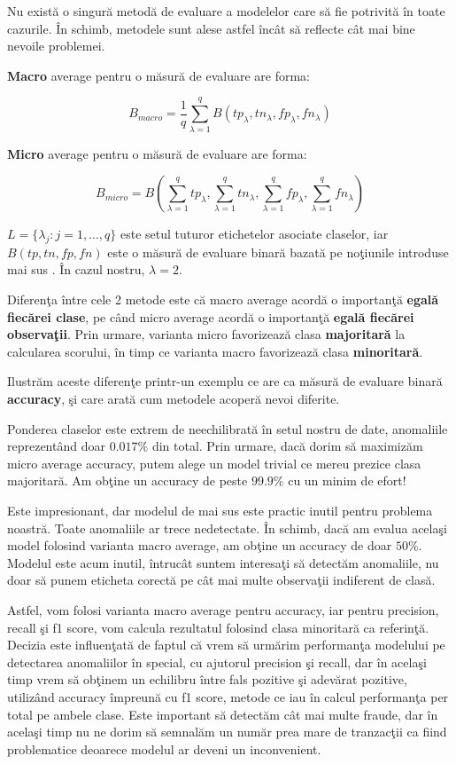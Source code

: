 Nu există o singură metodă de evaluare a modelelor care să fie potrivită în toate 
cazurile. În schimb, metodele sunt alese astfel încât să reflecte cât mai bine 
nevoile problemei.

\textbf{Macro} average pentru o măsură de evaluare are forma:

$$B_{macro}=\frac{1}{q} \sum_{\lambda=1}^{q} B(tp_{\lambda}, tn_{\lambda}, fp_{\lambda},
fn_{\lambda})$$

\textbf{Micro} average pentru o măsură de evaluare are forma:

$$B_{micro}=B(\sum_{\lambda=1}^{q} tp_{\lambda}, \sum_{\lambda=1}^{q} tn_{\lambda}, 
\sum_{\lambda=1}^{q} fp_{\lambda}, \sum_{\lambda=1}^{q} fn_{\lambda})$$

$L=\{\lambda_{j}: j=1,\dots,q \}$ este setul tuturor etichetelor asociate claselor, iar 
$B(tp, tn, fp, fn)$ este o măsură de evaluare binară bazată pe noţiunile introduse mai sus
\cite{Asch2013MacroandME}.
În cazul nostru, $\lambda=2$.


Diferenţa între cele 2 metode este că macro average acordă o importanţă 
\textbf{egală fiecărei 
clase}, pe când micro average acordă o importanţă 
\textbf{egală fiecărei observaţii}. Prin urmare,
varianta micro favorizează clasa 
\textbf{majoritară} la calcularea scorului, în timp ce varianta 
macro favorizează clasa \textbf{minoritară}.

Ilustrăm aceste diferenţe printr-un exemplu ce are ca măsură de evaluare binară 
\textbf{accuracy},
şi care arată cum metodele acoperă nevoi diferite.

Ponderea claselor este extrem de neechilibrată în setul nostru de date, anomaliile 
reprezentând doar $0.017\%$ din total. Prin urmare, dacă dorim să maximizăm 
micro average accuracy, putem alege un model trivial ce mereu prezice clasa majoritară.
Am obţine un accuracy de peste $99.9\%$ cu un minim de efort!

Este impresionant, dar modelul de mai sus este practic inutil pentru problema noastră.
Toate anomaliile ar trece nedetectate. În schimb, dacă am evalua acelaşi model folosind
varianta macro average, am obţine un accuracy de doar $50\%$. Modelul este acum inutil,
întrucât suntem interesaţi să detectăm anomaliile, nu doar să punem eticheta corectă 
pe cât mai multe observaţii indiferent de clasă.

Astfel, vom folosi varianta macro average pentru accuracy, iar pentru precision, recall şi 
f1 score, vom calcula rezultatul folosind clasa minoritară ca referinţă. Decizia este influenţată
de faptul că vrem să urmărim performanţa modelului pe detectarea anomaliilor în special, cu ajutorul
precision şi recall, dar în acelaşi timp vrem să obţinem un echilibru între fals pozitive şi 
adevărat pozitive, utilizând accuracy împreună cu f1 score, metode ce iau în calcul performanţa 
per total pe ambele clase. Este important să detectăm cât mai multe fraude, dar în acelaşi timp 
nu ne dorim să semnalăm un număr prea mare de tranzacţii ca fiind problematice deoarece modelul 
ar deveni un inconvenient.